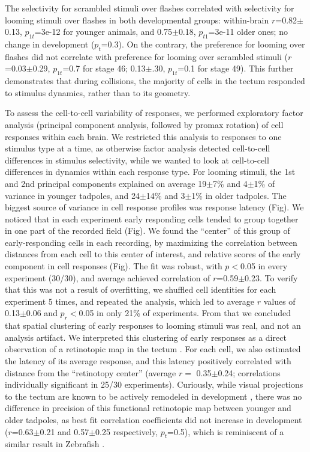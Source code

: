 \documentclass{article}
\begin{document}
The selectivity for scrambled stimuli over flashes correlated with selectivity for looming stimuli over flashes in both developmental groups: within-brain $r$=0.82$\pm$0.13, $p_{1t}$=3e-12 for younger animals, and 0.75$\pm$0.18, $p_{t1}$=3e-11 older ones; no change in development ($p_t$=0.3). On the contrary, the preference for looming over flashes did not correlate with preference for looming over scrambled stimuli ($r$=0.03$\pm$0.29, $p_{1t}$=0.7 for stage 46; 0.13$\pm$.30, $p_{1t}$=0.1 for stage 49). This further demonstrates that during collisions, the majority of cells in the tectum responded to stimulus dynamics, rather than to its geometry.

To assess the cell-to-cell variability of responses, we performed exploratory factor analysis (principal component analysis, followed by promax rotation) of cell responses within each brain. We restricted this analysis to responses to one stimulus type at a time, as otherwise factor analysis detected cell-to-cell differences in stimulus selectivity, while we wanted to look at cell-to-cell differences in dynamics within each response type. For looming stimuli, the 1st and 2nd principal components explained on average 19$\pm$7\% and 4$\pm$1\% of variance in younger tadpoles, and 24$\pm$14\% and 3$\pm$1\% in older tadpoles. The biggest source of variance in cell response profiles was response latency (Fig). We noticed that in each experiment early responding cells tended to group together in one part of the recorded field (Fig). We found the “center” of this group of early-responding cells in each recording, by maximizing the correlation between distances from each cell to this center of interest, and relative scores of the early component in cell responses (Fig). The fit was robust, with $p<$0.05 in every experiment (30/30), and average achieved correlation of $r$=0.59$\pm$0.23. To verify that this was not a result of overfitting, we shuffled cell identities for each experiment 5 times, and repeated the analysis, which led to average $r$ values of 0.13$\pm$0.06 and $p_r<$0.05 in only 21\% of experiments. From that we concluded that spatial clustering of early responses to looming stimuli was real, and not an analysis artifact. We interpreted this clustering of early responses as a direct observation of a retinotopic map in the tectum \citep{ruthazer2004map}. For each cell, we also estimated the latency of its average response, and this latency positively correlated with distance from the “retinotopy center” (average $r=$ 0.35$\pm$0.24; correlations individually significant in 25/30 experiments). Curiously, while visual projections to the tectum are known to be actively remodeled in development \citep{sakaguchi1985refinement,ruthazer2004map,munz2014hebbian}, there was no difference in precision of this functional retinotopic map between younger and older tadpoles, as best fit correlation coefficients did not increase in development ($r$=0.63$\pm$0.21 and 0.57$\pm$0.25 respectively, $p_t$=0.5), which is reminiscent of a similar result in Zebrafish \citep{avitan2016limitations}.
\end{document}
